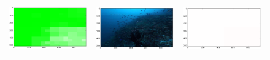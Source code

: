 \begin{figure}
\begin{tabular}{ccc}
\includegraphics[keepaspectratio=true,width=\segwidth]{images/segment/2737_10__animals__.png} &
\includegraphics[keepaspectratio=true,width=\segwidth]{images/segment/2737_10__image__.png} &
\includegraphics[keepaspectratio=true,width=\segwidth]{images/segment/2737_10__plastic__.png} \\


\end{tabular}
\end{figure}
